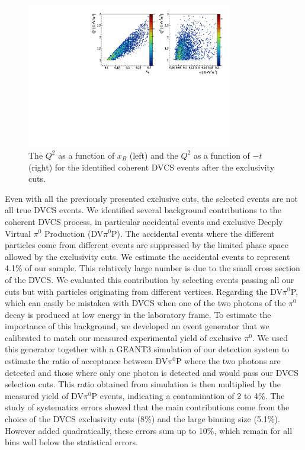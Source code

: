 \documentclass[nofootinbib,twocolumn,showpacs,prl,superscriptaddress,secnumarabic,amssymb,nobibnotes,aps,floatfix]{revtex4}
\begin{document}
\begin{figure}[tb]
\hspace{-0.45cm}
\includegraphics[width=9.0cm]{figs/Q2_xB_t_Coh.pdf}
\caption{The $Q^{2}$ as a function of $x_{B}$ (left) and the $Q^{2}$ as a 
function of $-t$ (right) for the identified coherent DVCS events after the 
exclusivity cuts.}
\label{fig:kin-coverage}
\end{figure}

Even with all the previously presented exclusive cuts, the selected events are
not all true DVCS events. We identified several background contributions to the 
coherent DVCS process, in particular accidental events and exclusive Deeply 
Virtual $\pi^0$ Production (DV$\pi^0$P). The accidental events where the 
different particles come from different events are suppressed by the limited 
phase space allowed by the exclusivity cuts. We estimate the accidental events 
to represent 4.1\% of our sample. This relatively large number is due to the 
small cross section of the DVCS. We evaluated this contribution by selecting 
events passing all our cuts but with particles originating from different 
vertices. Regarding the DV$\pi^0$P, which can easily be mistaken with DVCS when 
one of the two photons of the $\pi^0$ decay is produced at low energy in the 
laboratory frame. To estimate the importance of this background, we developed 
an event generator that we calibrated to match our measured experimental yield 
of exclusive $\pi^0$. We used this generator together with a GEANT3 simulation 
of our detection system to estimate the ratio of acceptance between DV$\pi^0$P 
where the two photons are detected and those where only one photon is detected 
and would pass our DVCS selection cuts. This ratio obtained from simulation is 
then multiplied by the measured yield of DV$\pi^0$P events, indicating a 
contamination of 2 to 4\%. The study of systematics errors showed that the main 
contributions come from the choice of the DVCS exclusivity cuts (8\%) and the 
large binning size (5.1\%). However added quadratically, these errors sum up to 
10\%, which remain for all bins well below the statistical errors.
\end{document}
